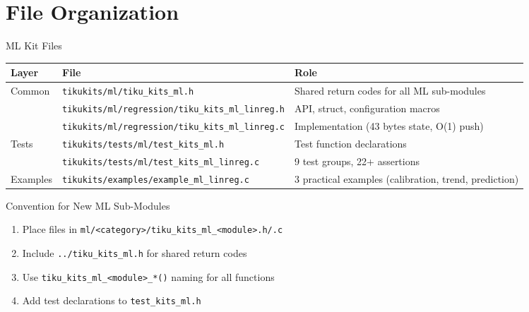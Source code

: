 \documentclass[aspectratio=169, 10pt]{beamer}
\begin{document}
\section{File Organization}

\begin{frame}[fragile]{ML Kit Files}
\begin{table}
\centering
\small
\begin{tabular}{@{}llp{5.5cm}@{}}
\toprule
\textbf{Layer} & \textbf{File} & \textbf{Role} \\
\midrule
\multirow{2}{*}{Common}
  & \texttt{tikukits/ml/tiku\_kits\_ml.h}
  & Shared return codes for all ML sub-modules \\
\midrule
\multirow{2}{*}{Linear Regression}
  & \texttt{tikukits/ml/regression/tiku\_kits\_ml\_linreg.h}
  & API, struct, configuration macros \\
  & \texttt{tikukits/ml/regression/tiku\_kits\_ml\_linreg.c}
  & Implementation (43 bytes state, O(1) push) \\
\midrule
\multirow{2}{*}{Tests}
  & \texttt{tikukits/tests/ml/test\_kits\_ml.h}
  & Test function declarations \\
  & \texttt{tikukits/tests/ml/test\_kits\_ml\_linreg.c}
  & 9 test groups, 22+ assertions \\
\midrule
Examples
  & \texttt{tikukits/examples/example\_ml\_linreg.c}
  & 3 practical examples (calibration, trend, prediction) \\
\bottomrule
\end{tabular}
\end{table}

\vspace{0.5em}
\begin{block}{Convention for New ML Sub-Modules}
\begin{enumerate}
  \item Place files in \texttt{ml/<category>/tiku\_kits\_ml\_<module>.h/.c}
  \item Include \texttt{../tiku\_kits\_ml.h} for shared return codes
  \item Use \texttt{tiku\_kits\_ml\_<module>\_*()} naming for all functions
  \item Add test declarations to \texttt{test\_kits\_ml.h}
\end{enumerate}
\end{block}
\end{frame}

\end{document}
